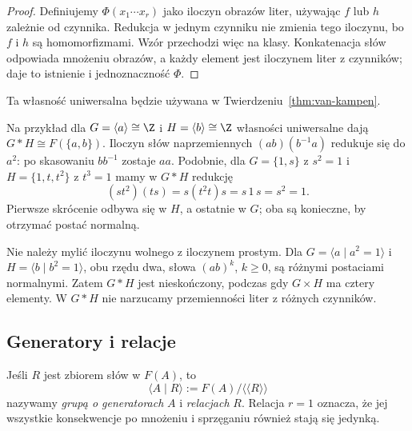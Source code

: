 \begin{proof}
Definiujemy $\Phi(x_1\cdots x_r)$ jako iloczyn obrazów liter,
używając $f$ lub $h$ zależnie od czynnika.
Redukcja w jednym czynniku nie zmienia tego iloczynu, bo
$f$ i $h$ są homomorfizmami. Wzór przechodzi więc na klasy.
Konkatenacja słów odpowiada mnożeniu obrazów, a każdy element
jest iloczynem liter z czynników; daje to istnienie i jednoznaczność $\Phi$.
\end{proof}

Ta własność uniwersalna będzie używana w
Twierdzeniu~\ref{thm:van-kampen}.

Na przykład dla $G=\langle a\rangle\cong\Z$
i $H=\langle b\rangle\cong\Z$ własności
uniwersalne dają $G*H\cong F(\{a,b\})$.
Iloczyn słów naprzemiennych
$(ab)(b^{-1}a)$ redukuje się do $a^2$:
po skasowaniu $bb^{-1}$ zostaje $aa$.
Podobnie, dla $G=\{1,s\}$ z $s^2=1$ i
$H=\{1,t,t^2\}$ z $t^3=1$ mamy w $G*H$ redukcję
\[
 (st^2)(ts)=s(t^2t)s=s\,1\,s=s^2=1.
\]
Pierwsze skrócenie odbywa się w $H$, a ostatnie w $G$;
oba są konieczne, by otrzymać postać normalną.

Nie należy mylić iloczynu wolnego z iloczynem prostym.
Dla $G=\langle a\mid a^2=1\rangle$ i
$H=\langle b\mid b^2=1\rangle$, obu rzędu dwa,
słowa $(ab)^k$, $k\geq0$, są różnymi postaciami normalnymi.
Zatem $G*H$ jest nieskończony, podczas gdy $G\times H$ ma
cztery elementy. W $G*H$ nie narzucamy przemienności liter
z różnych czynników.

\subsection*{Generatory i relacje}

\begin{definicja}
\label{def:prezentacja-grupy-5}
Jeśli $R$ jest zbiorem słów
w $F(A)$, to
\[
 \langle A\mid R\rangle
 :=F(A)/\langle\!\langle R\rangle\!\rangle
\]
nazywamy \emph{grupą o generatorach}
$A$ i \emph{relacjach} $R$.
Relacja $r=1$ oznacza, że jej
wszystkie konsekwencje po
mnożeniu i sprzęganiu również
stają się jedynką.
\end{definicja}

